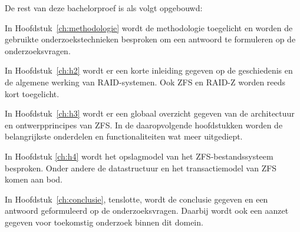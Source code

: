 De rest van deze bachelorproef is als volgt opgebouwd:

In Hoofdstuk~\ref{ch:methodologie} wordt de methodologie toegelicht en worden de gebruikte onderzoekstechnieken besproken om een antwoord te formuleren op de onderzoeksvragen.

In Hoofdstuk~\ref{ch:h2} wordt er een korte inleiding gegeven op de geschiedenis en de algemene werking van RAID-systemen. Ook ZFS en RAID-Z worden reeds kort toegelicht.

In Hoofdstuk~\ref{ch:h3} wordt er een globaal overzicht gegeven van de architectuur en ontwerpprincipes van ZFS. In de daaropvolgende hoofdstukken worden de belangrijkste onderdelen en functionaliteiten wat meer uitgediept. 

In Hoofdstuk \ref{ch:h4} wordt het opslagmodel van het ZFS-bestandssysteem besproken. Onder andere de datastructuur en het transactiemodel van ZFS komen aan bod.

In Hoofdstuk~\ref{ch:conclusie}, tenslotte, wordt de conclusie gegeven en een antwoord geformuleerd op de onderzoeksvragen. Daarbij wordt ook een aanzet gegeven voor toekomstig onderzoek binnen dit domein.

